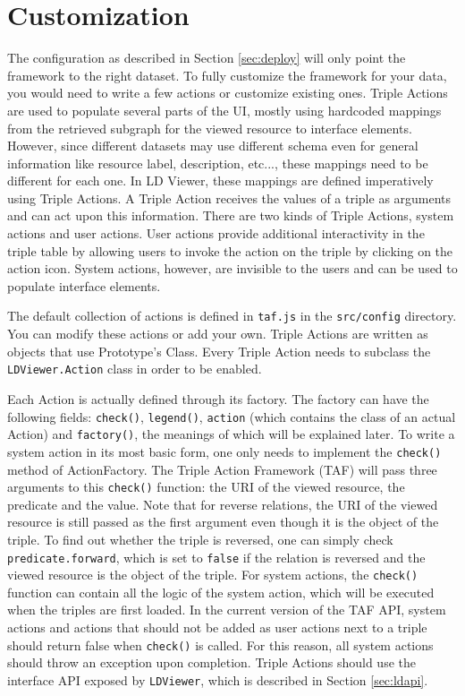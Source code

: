 \documentclass{article}
\begin{document}
\section{Customization}
\label{sec:makeactions}
The configuration as described in Section \ref{sec:deploy} will only point the framework to the right dataset.
To fully customize the framework for your data, you would need to write a few actions or customize existing ones.
Triple Actions are used to populate several parts of the UI, mostly using hardcoded mappings from the retrieved subgraph for the viewed resource to interface elements.
However, since different datasets may use different schema even for general information like resource label, description, etc..., these mappings need to be different for each one.
In LD Viewer, these mappings are defined imperatively using Triple Actions.
A Triple Action receives the values of a triple as arguments and can act upon this information.
There are two kinds of Triple Actions, system actions and user actions.
User actions provide additional interactivity in the triple table by allowing users to invoke the action on the triple by clicking on the action icon.
System actions, however, are invisible to the users and can be used to populate interface elements.

The default collection of actions is defined in \texttt{taf.js} in the \texttt{src/config} directory.
You can modify these actions or add your own.
Triple Actions are written as objects that use Prototype's Class.
Every Triple Action needs to subclass the \texttt{LDViewer.Action} class in order to be enabled.

Each Action is actually defined through its factory.
The factory can have the following fields: \texttt{check()}, \texttt{legend()}, \texttt{action} (which contains the class of an actual Action) and \texttt{factory()}, the meanings of which will be explained later.
To write a system action in its most basic form, one only needs to implement the \texttt{check()} method of ActionFactory.
The Triple Action Framework (TAF) will pass three arguments to this \texttt{check()} function: the URI of the viewed resource, the predicate and the value.
Note that for reverse relations, the URI of the viewed resource is still passed as the first argument even though it is the object of the triple.
To find out whether the triple is reversed, one can simply check \texttt{predicate.forward}, which is set to \texttt{false} if the relation is reversed and the viewed resource is the object of the triple.
For system actions, the \texttt{check()} function can contain all the logic of the system action, which will be executed when the triples are first loaded.
In the current version of the TAF API, system actions and actions that should not be added as user actions next to a triple should return false when \texttt{check()} is called.
For this reason, all system actions should throw an exception upon completion.
Triple Actions should use the interface API exposed by \texttt{LDViewer}, which is described in Section \ref{sec:ldapi}.
\end{document}
